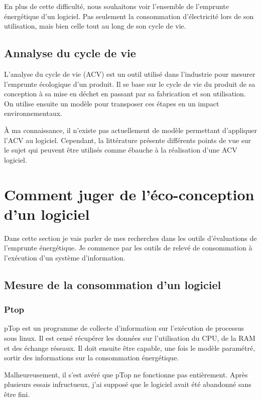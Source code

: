 \documentclass[a4paper, 11pt]{report}
\begin{document}
En plus de cette difficulté, nous souhaitons voir l'ensemble de l'emprunte énergétique d'un logiciel. Pas seulement la consommation d'électricité lors de son utilisation, mais bien celle tout au long de son cycle de vie.

\subsection{Annalyse du cycle de vie}
L'analyse du cycle de vie (ACV) est un outil utilisé dans l'industrie pour mesurer l'emprunte écologique d'un produit. Il se base sur le cycle de vie du produit de sa conception à sa mise en déchet en passant par sa fabrication et son utilisation. On utilise ensuite un modèle pour transposer ces étapes en un impact environnementaux.

À ma connaissance, il n'existe pas actuellement de modèle permettant d'appliquer l'ACV au logiciel. Cependant, la littérature présente différents points de vue sur le sujet qui peuvent être utilisés comme ébauche à la réalisation d'une ACV logiciel.

\section{Comment juger de l'éco-conception d'un logiciel}
Dans cette section je vais parler de mes recherches dans les outils d'évaluations de l'emprunte énergétique. Je commence par les outils de relevé de consommation à l'exécution d'un système d'information.

\subsection{Mesure de la consommation d'un logiciel}
\subsubsection{Ptop}
pTop est un programme de collecte d’information sur l'exécution de processus sous linux. Il est censé récupérer les données sur l'utilisation du CPU, de la RAM et des échange réseaux. Il doit ensuite être capable, une fois le modèle paramétré, sortir des informations sur la consommation énergétique.

Malheureusement, il s'est avéré que pTop ne fonctionne pas entièrement. Après plusieurs essais infructueux, j'ai supposé que le logiciel avait été abandonné sans être fini.
\end{document}
